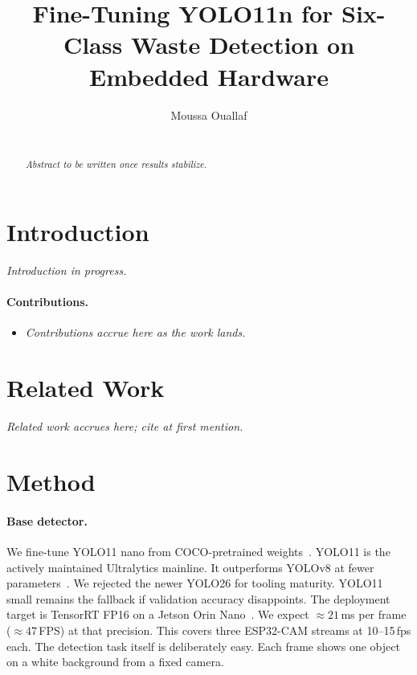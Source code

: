 \documentclass{article}
\title{Fine-Tuning YOLO11n for Six-Class Waste Detection on Embedded Hardware}
\author{%
  Moussa Ouallaf \\
  \texttt{} \\
}
\begin{document}
\maketitle


\begin{abstract}
\textit{Abstract to be written once results stabilize.}
\end{abstract}

\section{Introduction}
\textit{Introduction in progress.}

\paragraph{Contributions.}
\begin{itemize}
  \item \textit{Contributions accrue here as the work lands.}
\end{itemize}

\section{Related Work}
\textit{Related work accrues here; cite at first mention.}

\section{Method}
\paragraph{Base detector.}
We fine-tune YOLO11 nano from COCO-pretrained weights~\citep{jocher2024yolo11,lin2014microsoft}.
YOLO11 is the actively maintained Ultralytics mainline.
It outperforms YOLOv8 at fewer parameters~\citep{jocher2023yolov8}.
We rejected the newer YOLO26 for tooling maturity.
YOLO11 small remains the fallback if validation accuracy disappoints.
The deployment target is TensorRT FP16 on a Jetson Orin Nano~\citep{nvidia_tensorrt}.
We expect $\approx 21$\,ms per frame ($\approx 47$\,FPS) at that precision.
This covers three ESP32-CAM streams at 10--15\,fps each.
The detection task itself is deliberately easy.
Each frame shows one object on a white background from a fixed camera.
\end{document}
